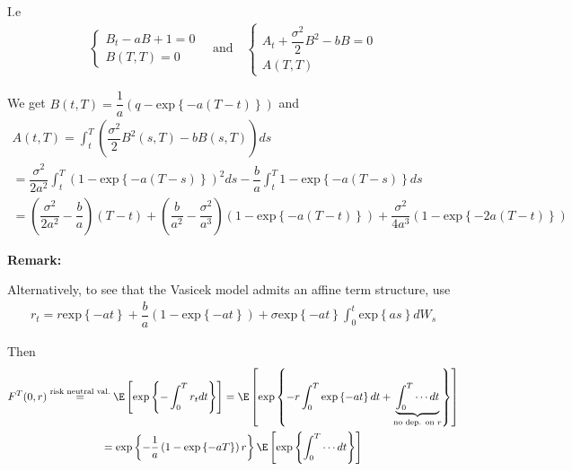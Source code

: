 \noindent I.e
\begin{equation*}
  \begin{gathered}
    \begin{cases}
      B_t-aB+1=0\\
      B(T,T) = 0
      \end{cases}\quad\text{and}\quad\begin{cases}
      A_t+\dfrac{\sigma^2}{2}B^2-bB=0\\
      A(T,T)
    \end{cases}
  \end{gathered}
\end{equation*}\par
\noindent We get $B(t,T) = \dfrac{1}{a}\left(q-\text{exp}\left\{-a(T-t)\right\}\right)$ and
\begin{equation*}
  \begin{gathered}
    A(t,T) = \int_{t}^{T}\left(\dfrac{\sigma^2}{2}B^2(s,T)-bB(s,T)\right)ds\\
    = \dfrac{\sigma^2}{2a^2}\int_{t}^{T}\left(1-\text{exp}\left\{-a(T-s)\right\}\right)^2ds-\dfrac{b}{a}\int_{t}^{T}1-\text{exp}\left\{-a(T-s)\right\}ds\\
    =\left(\dfrac{\sigma^2}{2a^2}-\dfrac{b}{a}\right)(T-t)+\left(\dfrac{b}{a^2}-\dfrac{\sigma^2}{a^3}\right)\left(1-\text{exp}\left\{-a(T-t)\right\}\right)+\dfrac{\sigma^2}{4a^3}\left(1-\text{exp}\left\{-2a(T-t)\right\}\right)
  \end{gathered}
\end{equation*}
\par\bigskip
\noindent\textbf{Remark:}\par
\noindent Alternatively, to see that the Vasicek model admits an affine term structure, use
\begin{equation*}
  \begin{gathered}
    r_t = r\text{exp}\left\{-at\right\}+\dfrac{b}{a}\left(1-\text{exp}\left\{-at\right\}\right)+\sigma\text{exp}\left\{-at\right\}\int_{0}^{t}\text{exp}\left\{as\right\}dW_s
  \end{gathered}
\end{equation*}\par
\noindent Then
\begin{equation*}
  \begin{gathered}
    F^T(0,r) \stackrel{\text{risk neutral val.}}{=} \E\left[\text{exp}\left\{-\int_{0}^{T}r_tdt\right\}\right]=\E\left[\text{exp}\left\{-r\int_{0}^{T}\text{exp}\left\{-at\right\}dt+\underbrace{\int_{0}^{T}\cdots dt}_{\substack{\text{no dep. on $r$}}}\right\}\right]\\
    =\text{exp}\left\{-\dfrac{1}{a}\left(1-\text{exp}\left\{-aT\right\}\right)r\right\}\E\left[\text{exp}\left\{\int_{0}^{T}\cdots dt\right\}\right]
  \end{gathered}
\end{equation*}\par
